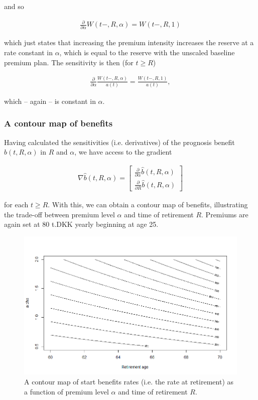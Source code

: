 \documentclass{article}
\newcommand{\1}[1]{\mathbbm{1}_{\left\lbrace #1 \right\rbrace}}
\theoremstyle{break}
\theoremstyle{remark}
\numberwithin{equation}{section}
\begin{document}
and so

\begin{align} \label{AlphaDeriv}
	\frac{\partial}{\partial \alpha }W(t-,R,\alpha) = W(t-,R,1)
\end{align}

which just states that increasing the premium intensity increases the reserve at a rate constant in $\alpha$, which is equal to the reserve with the unscaled baseline premium plan. The sensitivity is then (for $t \geq R$)

\begin{align} \label{ResDeriv}
	\frac{\partial}{\partial \alpha }\frac{W(t-,R,\alpha)}{a(t)} = \frac{W(t-,R,1)}{a(t)},
\end{align}

which -- again -- is constant in $\alpha$.

\subsubsection{A contour map of benefits}

Having calculated the sensitivities (i.e. derivatives) of the prognosis benefit $\hat{b}(t,R,\alpha)$ in $R$ and $\alpha$, we have access to the gradient

\begin{align*}
	\nabla \hat{b}(t,R,\alpha) =
	\begin{bmatrix}
		\frac{\partial}{\partial \alpha }\hat{b}(t,R,\alpha) \\
		\frac{\partial}{\partial R }\hat{b}(t,R,\alpha)
	\end{bmatrix}
\end{align*}

for each $t \geq R$. With this, we can obtain a contour map of benefits, illustrating the trade-off between premium level $\alpha$ and time of retirement $R$. Premiums are again set at 80 t.DKK yearly beginning at age 25.

\begin{figure}[H] \label{ContourGraph}
	\centering
	\caption{A contour map of start benefits rates (i.e. the rate at retirement) as a function of premium level $\alpha$ and time of retirement $R$.}
	\includegraphics[width=\textwidth]{Contour}		
\end{figure}
\end{document}
